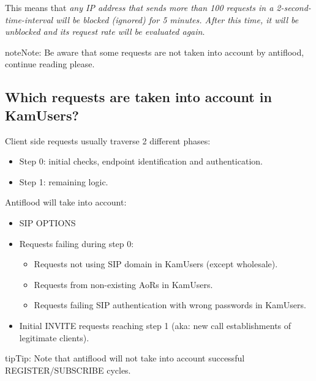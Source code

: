 \documentclass[letterpaper,10pt,english]{sphinxmanual}
\begin{document}
This means that \emph{any IP address that sends more than 100 requests in a 2-second-time-interval will be blocked (ignored)
for 5 minutes. After this time, it will be unblocked and its request rate will be evaluated again}.

\begin{notice}{note}{Note:}
Be aware that some requests are not taken into account by antiflood, continue reading please.
\end{notice}


\subsection{Which requests are taken into account in KamUsers?}
\label{security_and_maintenance/security/antiflooding:which-requests-are-taken-into-account-in-kamusers}
Client side requests usually traverse 2 different phases:
\begin{itemize}
\item {} 
Step 0: initial checks, endpoint identification and authentication.

\item {} 
Step 1: remaining logic.

\end{itemize}

Antiflood will take into account:
\begin{itemize}
\item {} 
SIP OPTIONS

\item {} 
Requests failing during step 0:
\begin{itemize}
\item {} 
Requests not using SIP domain in KamUsers (except wholesale).

\item {} 
Requests from non-existing AoRs in KamUsers.

\item {} 
Requests failing SIP authentication with wrong passwords in KamUsers.

\end{itemize}

\item {} 
Initial INVITE requests reaching step 1 (aka: new call establishments of legitimate clients).

\end{itemize}

\begin{notice}{tip}{Tip:}
Note that antiflood will not take into account successful REGISTER/SUBSCRIBE cycles.
\end{notice}
\end{document}
